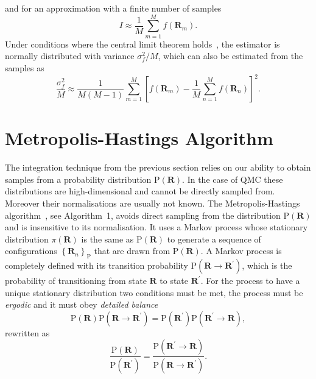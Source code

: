 and for an approximation with a finite number of samples
\begin{equation}
	I \approx \frac{1}{M} \sum_{m=1}^{M} f\left(\mathbf{R}_{m}\right).
\end{equation}
Under conditions where the central limit theorem holds~\cite{foulkes2001quantum}, the estimator is normally distributed with variance $\sigma_{f}^{2}/M$, which can also be estimated from the samples as
\begin{equation}
	\frac{\sigma_{f}^{2}}{M} \approx \frac{1}{M(M-1)} \sum_{m=1}^{M}\left[f\left(\mathbf{R}_{m}\right)-\frac{1}{M} \sum_{n=1}^{M} f\left(\mathbf{R}_{n}\right)\right]^{2}.
\end{equation}


\section{Metropolis-Hastings Algorithm}
\label{sec:Impl-MCMC}
The integration technique from the previous section relies on our ability to obtain samples from a probability distribution $\mathrm{P}(\mathbf{R})$. In the case of QMC these distributions are high-dimensional and cannot be directly sampled from. Moreover their normalisations are usually not known. 
The Metropolis-Hastings algorithm~\cite{hastings1970monte}, see Algorithm~1, avoids direct sampling from the distribution $\mathrm{P}(\mathbf{R})$ and is insensitive to its normalisation. It uses a Markov process whose stationary distribution $\pi(\mathbf{R})$ is the same as $\mathrm{P}(\mathbf{R})$	
to generate a sequence of configurations $\left\{\mathbf{R}_n\right\}_\mathrm{P}$ 
that are drawn from $\mathrm{P}(\mathbf{R})$. A Markov process is completely defined with its transition probability $\mathrm{P}(\mathbf{R} \rightarrow \mathbf{R}^\prime)$, which is the probability of transitioning from state $\mathbf{R}$ to state $\mathbf{R}^\prime$. For the process to have a unique stationary distribution two conditions must be met, the process must be \emph{ergodic} and it must obey \emph{detailed balance}
\begin{equation}
	\mathrm{P}(\mathbf{R}) \mathrm P(\mathbf{R} \rightarrow \mathbf{R}^\prime) = \mathrm{P}(\mathbf{R}^\prime) \mathrm P(\mathbf{R}^\prime \rightarrow \mathbf{R}),
\end{equation}
rewritten as
\begin{equation}
	\label{eq:detailed_balance}
	\frac{\mathrm P ({\mathbf{R}})}{\mathrm P ({\mathbf{R}^\prime})} = \frac{\mathrm P(\mathbf{R}^\prime \rightarrow \mathbf{R})}{\mathrm P(\mathbf{R} \rightarrow \mathbf{R}^\prime)}.
\end{equation}
